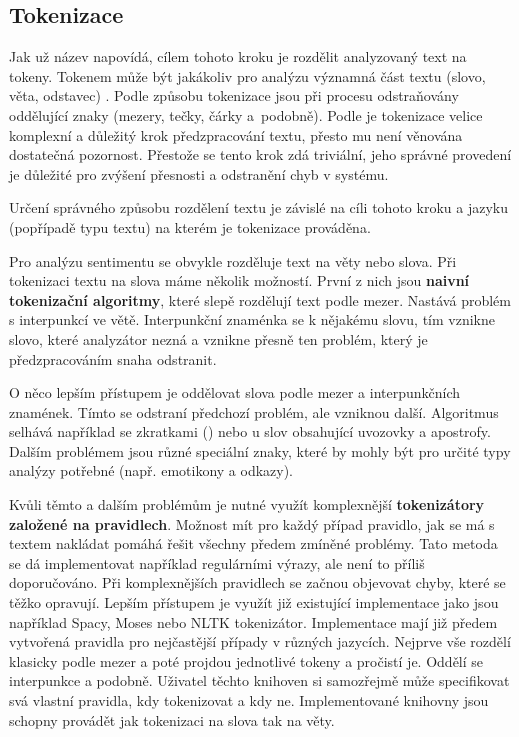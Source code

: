\subsection{Tokenizace}
Jak už název napovídá, cílem tohoto kroku je rozdělit analyzovaný text na tokeny. Tokenem může být jakákoliv pro analýzu významná část textu (slovo, věta, odstavec) \cite{gdcoder}. Podle způsobu tokenizace jsou při procesu odstraňovány oddělující znaky (mezery, tečky, čárky a~podobně). 
Podle \cite{mlexplained} je tokenizace velice komplexní a důležitý krok předzpracování textu, přesto mu není věnována dostatečná pozornost. Přestože se tento krok zdá triviální, jeho správné provedení je důležité pro zvýšení přesnosti a odstranění chyb v systému.

Určení správného způsobu rozdělení textu je závislé na cíli tohoto kroku a jazyku (popřípadě typu textu) na kterém je tokenizace prováděna. 

Pro analýzu sentimentu se obvykle rozděluje text na věty nebo slova.
Při tokenizaci textu na slova máme několik možností.
První z nich jsou \textbf{naivní tokenizační algoritmy}, které slepě rozdělují text podle mezer. Nastává problém s interpunkcí ve větě. Interpunkční znaménka se  k nějakému slovu, tím vznikne slovo, které analyzátor nezná a vznikne přesně ten problém, který je předzpracováním snaha odstranit. 


O něco lepším přístupem je oddělovat slova podle mezer a interpunkčních znamének. Tímto se odstraní předchozí problém, ale vzniknou další. Algoritmus selhává například se zkratkami () nebo u slov obsahující uvozovky a apostrofy. Dalším problémem jsou různé speciální znaky, které by mohly být pro určité typy analýzy potřebné (např. emotikony a odkazy).

Kvůli těmto a dalším problémům je nutné využít komplexnější \textbf{tokenizátory založené na pravidlech}. Možnost mít pro každý případ pravidlo, jak se má s textem nakládat pomáhá řešit všechny předem zmíněné problémy. Tato metoda se dá implementovat například regulárními výrazy, ale není to příliš doporučováno. Při komplexnějších pravidlech se začnou objevovat chyby, které se těžko opravují. Lepším přístupem je využít již existující implementace jako jsou například Spacy, Moses nebo NLTK tokenizátor. Implementace mají již předem vytvořená pravidla pro nejčastější případy v různých jazycích. Nejprve vše rozdělí klasicky podle mezer a poté projdou jednotlivé tokeny a pročistí je. Oddělí se interpunkce a podobně. Uživatel těchto knihoven si samozřejmě může specifikovat svá vlastní pravidla, kdy tokenizovat a kdy ne. Implementované knihovny jsou schopny provádět jak tokenizaci na slova tak na věty.



